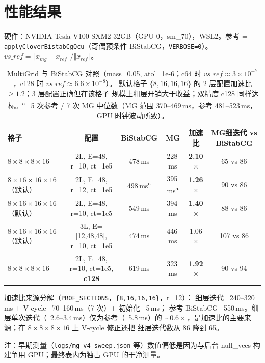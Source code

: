 \documentclass[11pt,a4paper]{article}
\begin{document}
\section{性能结果}
\label{sec:perf}

硬件：NVIDIA Tesla V100-SXM2-32GB（GPU 0，sm\_70），WSL2。参考 =
\texttt{applyCloverBistabCgQcu}（奇偶预条件 BiStabCG，\texttt{VERBOSE=0}）。
$vs\_ref=\Vert x_{mg}-x_{ref}\Vert/\Vert x_{ref}\Vert$。

\begin{table}[h]
\centering
\begin{tabular}{lccccc}
\toprule
格子 & 配置 & BiStabCG & MG & 加速比 & MG细迭代 vs BiStabCG \\
\midrule
$8\times8\times8\times16$ & 2L, E=48, r=10, ct=1e5 & 478\,ms & 228\,ms &
\textbf{2.10$\times$} & 65 vs 86 \\
$8\times16\times16\times16$（默认） & 2L, E=48, r=12, ct=1e5 & 498\,ms\textsuperscript{a} &
395\,ms\textsuperscript{a} & \textbf{1.26$\times$} & 90 vs 86 \\
$8\times16\times16\times16$（默认） & 2L, E=48, r=10, ct=1e5 & 549\,ms &
394\,ms & \textbf{1.40$\times$} & 88 vs 86 \\
$8\times16\times16\times16$（默认） & 3L, E=[12,48,48], r=10, ct=1e5 & 474\,ms &
446\,ms & 1.06$\times$ & 107 vs 86 \\
$8\times8\times8\times16$ & 2L, E=48, r=10, ct=1e5, \textbf{c128} & 619\,ms &
323\,ms & \textbf{1.92$\times$} & 90 vs 94 \\
\bottomrule
\end{tabular}
\caption{MultiGrid 与 BiStabCG 对照（mass=0.05, atol=1e-6；c64 时
$vs\_ref\approx3\times10^{-7}$，c128 时 $vs\_ref\approx6.6\times10^{-8}$）。
默认格子 $\{8,16,16,16\}$ 的 $2$ 层配置加速比 $\ge1.2$；$3$ 层配置正确但在该格子
规模上粗层开销大于收益；双精度 c128 同样达标。\textsuperscript{a}=5 次参考 /
7 次 MG 中位数（MG 范围 370--469\,ms，参考 481--523\,ms，GPU 时钟波动所致）。}
\end{table}

加速比来源分解（\texttt{PROF\_SECTIONS}，\texttt{\{8,16,16,16\}}，r=12）：
细层迭代 ~240--320\,ms + V-cycle ~70--160\,ms（7 次）+ 初始化 ~5\,ms；
参考 BiStabCG ~550\,ms。细层单次迭代（~2.6--3.4\,ms）仅为参考（~5.8\,ms）的
$\sim0.6\times$，是加速比的主要来源；在 $8\times8\times8\times16$ 上 V-cycle 修正还把
细层迭代数从 86 降到 65。

注：早期测量（\texttt{logs/mg\_v4\_sweep.json} 等）数值偏低是因为与后台
null\_vecs 构建争用 GPU；最终表内为独占 GPU 的干净测量。
\end{document}

